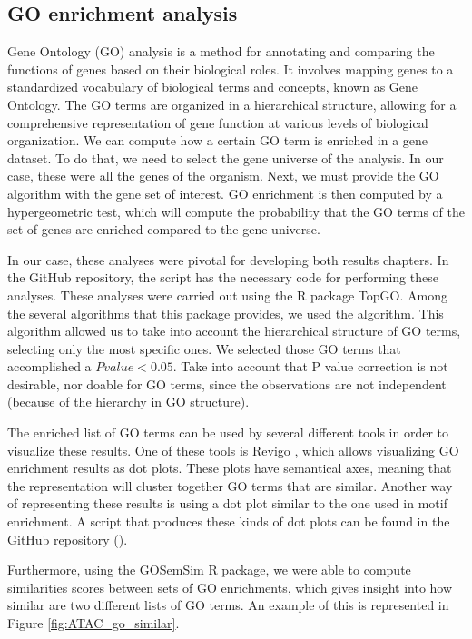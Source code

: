 \subsection{GO enrichment analysis}
\label{sec:GO_enrichment}

Gene Ontology (GO) analysis is a method for annotating and comparing the functions of genes based on their biological roles. It involves mapping genes to a standardized vocabulary of biological terms and concepts, known as Gene Ontology. The GO terms are organized in a hierarchical structure, allowing for a comprehensive representation of gene function at various levels of biological organization. We can compute how a certain GO term is enriched in a gene dataset. To do that, we need to select the gene universe of the analysis. In our case, these were all the genes of the organism. Next, we must provide the GO algorithm with the gene set of interest. GO enrichment is then computed by a hypergeometric test, which will compute the probability that the GO terms of the set of genes are enriched compared to the gene universe. 

In our case, these analyses were pivotal for developing both results chapters. In the GitHub repository, the script  has the necessary code for performing these analyses. These analyses were carried out using the R package TopGO. Among the several algorithms that this package provides, we used the  algorithm. This algorithm allowed us to take into account the hierarchical structure of GO terms, selecting only the most specific ones. We selected those GO terms that accomplished a $P value < 0.05$. Take into account that P value correction is not desirable, nor doable for GO terms, since the observations are not independent (because of the hierarchy in GO structure). 

The enriched list of GO terms can be used by several different tools in order to visualize these results. One of these tools is Revigo \parencite{supek_revigo_2011}, which allows visualizing GO enrichment results as dot plots. These plots have semantical axes, meaning that the representation will cluster together GO terms that are similar.
Another way of representing these results is using a dot plot similar to the one used in motif enrichment. A script that produces these kinds of dot plots can be found in the GitHub repository ().

Furthermore, using the GOSemSim R package, we were able to compute similarities scores between sets of GO enrichments, which gives insight into how similar are two different lists of GO terms. An example of this is represented in Figure \ref{fig:ATAC_go_similar}.

